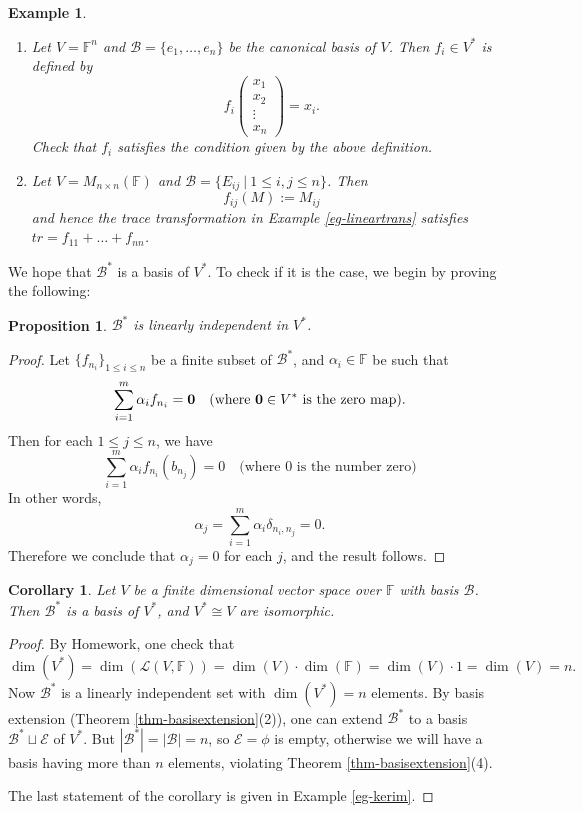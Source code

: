 \documentclass[12pt]{amsbook}
\newtheorem{corollary}[theorem]{Corollary}
\newtheorem{example}[theorem]{Example}
\newtheorem{proposition}[theorem]{Proposition}
\begin{document}
\begin{example} \
    \begin{enumerate}
        \item Let $V = \mathbb{F}^n$ and $\mathcal{B} = \{e_1, \dots, e_n\}$ be the canonical basis of $V$. Then $f_i \in V^*$ is defined by
        $$f_i\begin{pmatrix} x_1 \\ x_2 \\ \vdots \\ x_n \end{pmatrix} = x_i.$$
        Check that $f_i$ satisfies the condition given by the above definition.

        \item Let $V = M_{n \times n}(\mathbb{F})$ and $\mathcal{B} = \{E_{ij}\ |\ 1 \leq i, j \leq n\}$. Then
        $$f_{ij}(M) := M_{ij}$$
        and hence the trace transformation in Example \ref{eg-lineartrans} satisfies $tr = f_{11} + \dots + f_{nn}$.
    \end{enumerate}
\end{example}

We hope that $\mathcal{B}^*$ is a basis of $V^*$. To check if it is the case, we begin by proving the following:
\begin{proposition}
    $\mathcal{B}^*$ is linearly independent in $V^*$.
\end{proposition}
\begin{proof}
    Let $\{f_{n_i}\}_{1 \leq i \leq n}$ be a finite subset of $\mathcal{B}^*$, and $\alpha_i \in \mathbb{F}$ be such that 
    $$ \sum_{i=1}^{m} \alpha_if_{n_i} = {\bf 0} \quad \text{(where}\ {\bf 0} \in V^*\ \text{is the zero map)}.$$
    Then for each $1 \leq j \leq n$, we have 
    $$\sum_{i=1}^{m} \alpha_i f_{n_i} (b_{n_j}) = 0 \quad \text{(where 0 is the number zero)} $$
    In other words,
    $$\alpha_j = \sum_{i=1}^{m} \alpha_i \delta_{n_i, n_j} = 0.$$
    Therefore we conclude that $\alpha_j=0$ for each $j$, and the result follows.
    \end{proof}

\begin{corollary}
    Let $V$ be a finite dimensional vector space over $\mathbb{F}$ with basis $\mathcal{B}$. Then $\mathcal{B}^*$ is a basis of $V^*$, and $V^* \cong V$ are isomorphic.
\end{corollary}
\begin{proof}
    By Homework, one check that 
    $$\dim(V^*) = \dim(\mathcal{L}(V,\mathbb{F})) = \dim(V) \cdot \dim(\mathbb{F}) = \dim(V) \cdot 1 = \dim(V) = n.$$ 
    Now $\mathcal{B}^*$ is a linearly independent set with $\dim(V^*) = n$ elements. By basis extension (Theorem \ref{thm-basisextension}(2)), one can extend $\mathcal{B}^*$ to a basis $\mathcal{B}^* \sqcup \mathcal{E}$ of $V^*$. But $|\mathcal{B}^*| = |\mathcal{B}|=n$, so $\mathcal{E} = \phi$ is empty, otherwise we will have a basis having more than $n$ elements, violating Theorem \ref{thm-basisextension}(4).

    The last statement of the corollary is given in Example \ref{eg-kerim}.
\end{proof}
\end{document}
